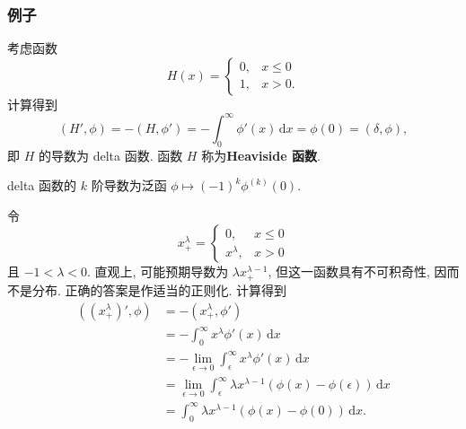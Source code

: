 \subsubsection{例子}\label{subsec:distribution-derivative-examples}

\begin{Example}
\label{ex:heaviside-derivative}
考虑函数
\begin{equation}\label{eq:heaviside-function-definition}
H(x)=\begin{cases}0,&x\leq0\\1,&x>0.\end{cases}
\end{equation}
计算得到
\begin{equation}\label{eq:heaviside-derivative-delta-pairing}
(H',\phi)=-(H,\phi')=-\int_0^\infty\phi'(x)\,\mathrm{d}x=\phi(0)=(\delta,\phi),
\end{equation}
即 $H$ 的导数为 delta 函数. 函数 $H$ 称为\textbf{Heaviside 函数}.
\end{Example}

\begin{Example}
\label{ex:higher-delta-derivative}
delta 函数的 $k$ 阶导数为泛函 $\phi\mapsto(-1)^k\phi^{(k)}(0)$.
\end{Example}

\begin{Example}
\label{ex:singular-power-derivative}
令
\begin{equation}\label{eq:positive-part-singular-power}
x_+^\lambda=\begin{cases}0,&x\leq0\\x^\lambda,&x>0\end{cases}
\end{equation}
且 $-1<\lambda<0$. 直观上, 可能预期导数为 $\lambda x_+^{\lambda-1}$, 但这一函数具有不可积奇性, 因而不是分布. 正确的答案是作适当的正则化. 计算得到\[
\begin{aligned}
((x_+^\lambda)',\phi)&=-(x_+^\lambda,\phi')\\
&=-\int_0^\infty x^\lambda\phi'(x)\,\mathrm{d}x\\
&=-\lim_{\epsilon\to0}\int_\epsilon^\infty x^\lambda\phi'(x)\,\mathrm{d}x\\
&=\lim_{\epsilon\to0}\int_\epsilon^\infty\lambda x^{\lambda-1}(\phi(x)-\phi(\epsilon))\,\mathrm{d}x\\
&=\int_0^\infty\lambda x^{\lambda-1}(\phi(x)-\phi(0))\,\mathrm{d}x.
\end{aligned}
\]
\end{Example}


